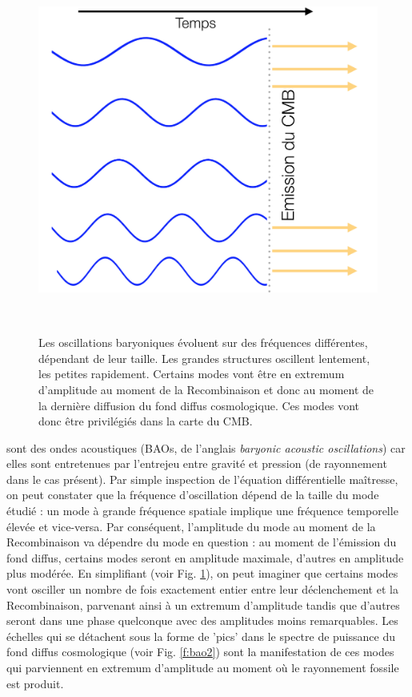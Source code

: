 \begin{figure}[htbp]
	\centering
		\includegraphics[height=12cm]{figs/bao1.png}
	\caption[Les oscillations baryoniques évoluent sur des fréquences différentes, dépendant de leur taille.]{Les oscillations baryoniques évoluent sur des fréquences différentes, dépendant de leur taille. Les grandes structures oscillent lentement, les petites rapidement. Certains modes vont être en extremum d'amplitude au moment de la Recombinaison et donc au moment de la dernière diffusion du fond diffus cosmologique. Ces modes vont donc être privilégiés dans la carte du CMB.}
	\label{f:bao1}
\end{figure}


  sont des ondes acoustiques (BAOs, de l'anglais \textit{baryonic acoustic oscillations}) car elles sont entretenues par l'entrejeu entre gravité et pression (de rayonnement dans le cas présent). Par simple inspection de l'équation différentielle maîtresse, on peut constater que la fréquence d'oscillation dépend de la taille du mode étudié : un mode à grande fréquence spatiale implique une fréquence temporelle élevée et vice-versa. Par conséquent, l'amplitude du mode au moment de la Recombinaison va dépendre du mode en question : au moment de l'émission du fond diffus, certains modes seront en amplitude maximale, d'autres en amplitude plus modérée. En simplifiant (voir Fig. \ref{f:bao1}), on peut imaginer que certains modes vont osciller un nombre de fois exactement entier entre leur déclenchement et la Recombinaison, parvenant ainsi à un extremum d'amplitude tandis que d'autres seront dans une phase quelconque avec des amplitudes moins remarquables. Les échelles qui se détachent sous la forme de 'pics' dans le spectre de puissance du fond diffus cosmologique (voir Fig. \ref{f:bao2}) sont la manifestation de ces modes qui parviennent en extremum d'amplitude au moment où le rayonnement fossile est produit.



